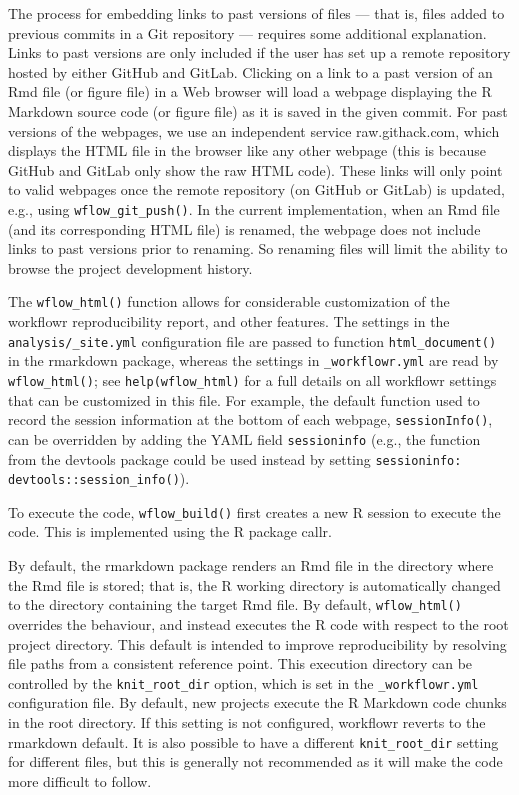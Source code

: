 \documentclass[9pt,a4paper]{extarticle}
\begin{document}
The process for embedding links to past versions of files --- that is,
files added to previous commits in a Git repository --- requires some
additional explanation. Links to past versions are only included if the
user has set up a remote repository hosted by either GitHub and GitLab.
Clicking on a link to a past version of an Rmd file (or figure file) in
a Web browser will load a webpage displaying the R Markdown source code
(or figure file) as it is saved in the given commit. For past versions
of the webpages, we use an independent service raw.githack.com, which
displays the HTML file in the browser like any other webpage (this is
because GitHub and GitLab only show the raw HTML code). These links will
only point to valid webpages once the remote repository (on GitHub or
GitLab) is updated, e.g., using \texttt{wflow\_git\_push()}. In the current
implementation, when an Rmd file (and its corresponding HTML file) is
renamed, the webpage does not include links to past versions prior to
renaming. So renaming files will limit the ability to browse the project
development history.

The \texttt{wflow\_html()} function allows for considerable customization of the
workflowr reproducibility report, and other features. The settings in
the \verb|analysis/_site.yml| configuration file are passed to function
\texttt{html\_document()} in the rmarkdown package, whereas the settings in
\verb|_workflowr.yml| are read by \texttt{wflow\_html()}; see
\texttt{help(wflow\_html)} for a full details on all workflowr settings
that can be customized in this file. For example, the default function
used to record the session information at the bottom of each webpage,
\texttt{sessionInfo()}, can be overridden by adding the YAML field
\verb|sessioninfo| (e.g., the function from the devtools package could
be used instead by setting \texttt{sessioninfo:
devtools::session\_info()}).

To execute the code, \texttt{wflow\_build()} first creates a new R session to
execute the code. This is implemented using the R package callr.

By default, the rmarkdown package renders an Rmd file in the directory
where the Rmd file is stored; that is, the R working directory is
automatically changed to the directory containing the target Rmd file.
By default, \texttt{wflow\_html()} overrides the behaviour, and instead executes
the R code with respect to the root project directory. This default is
intended to improve reproducibility by resolving file paths from a
consistent reference point. This execution directory can be controlled
by the \verb|knit_root_dir| option, which is set in the 
\texttt{\_workflowr.yml} configuration file. By default, new projects execute the
R Markdown code chunks in the root directory. If this setting is not
configured, workflowr reverts to the rmarkdown default. It is also
possible to have a different \texttt{knit\_root\_dir} setting for
different files, but this is generally not recommended as it will make
the code more difficult to follow.
\end{document}
